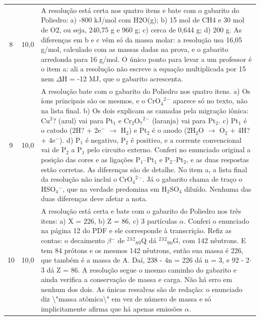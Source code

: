\documentclass{article}%
\begin{document}
\begin{longtable}{@{}c c p{}@{}}
8 & 10,0 & A resolução está certa nos quatro itens e bate com o gabarito do Poliedro: a) -800 kJ/mol com H2O(g); b) 15 mol de CH4 e 30 mol de O2, ou seja, 240,75 g e 960 g; c) cerca de 0,644 g; d) 200 g. As diferenças em b e c vêm só da massa molar: a resolução usa 16,05 g/mol, calculado com as massas dadas na prova, e o gabarito arredonda para 16 g/mol. O único ponto para levar a um professor é o item a: ali a resolução não escreve a equação multiplicada por 15 nem $\Delta$H = -12 MJ, que o gabarito acrescenta. \\
9 & 10,0 & A resolução bate com o gabarito do Poliedro nos quatro itens. a) Os íons principais são os mesmos, e o CrO$_{4}$$^2$$^{-}$ aparece só no texto, não na lista final. b) Os dois explicam as camadas pela migração iônica: Cu$^2$? (azul) vai para Pt$_{1}$ e Cr$_{2}$O$_{7}$$^2$$^{-}$ (laranja) vai para Pt$_{2}$. c) Pt$_{1}$ é o catodo (2H? + 2e$^{-}$ $\to$ H$_{2}$) e Pt$_{2}$ é o anodo (2H$_{2}$O $\to$ O$_{2}$ + 4H? + 4e$^{-}$). d) P$_{1}$ é negativo, P$_{2}$ é positivo, e a corrente convencional vai de P$_{2}$ a P$_{1}$ pelo circuito externo. Conferi no enunciado original a posição das cores e as ligações P$_{1}$--Pt$_{1}$ e P$_{2}$--Pt$_{2}$, e as duas respostas estão corretas. As diferenças são de detalhe. No item a, a lista final da resolução não inclui o CrO$_{4}$$^2$$^{-}$. Já o gabarito chama de traço o HSO$_{4}$$^{-}$, que na verdade predomina em H$_{2}$SO$_{4}$ diluído. Nenhuma das duas diferenças deve afetar a nota. \\
10 & 10,0 & A resolução está certa e bate com o gabarito do Poliedro nos três itens: a) X = 226, b) Z = 86, c) 3 partículas $\alpha$. Conferi o enunciado na página 12 do PDF e ele corresponde à transcrição. Refiz as contas: o decaimento $\beta$$^{-}$ de $^2$$^3$$^2$$_{8}$$_{9}$Q dá $^2$$^3$$^2$$_{9}$$_{0}$G, com 142 nêutrons. E tem 84 prótons e os mesmos 142 nêutrons, então sua massa é 226, que também é a massa de A. Daí, 238 - 4n = 226 dá n = 3, e 92 - 2$\cdot$3 dá Z = 86. A resolução segue o mesmo caminho do gabarito e ainda verifica a conservação de massa e carga. Não há erro em nenhum dos dois. As únicas ressalvas são de redação: o enunciado diz \textbackslash{}"massa atômica\textbackslash{}" em vez de número de massa e só implicitamente afirma que há apenas emissões $\alpha$. \\
\bottomrule\end{longtable}%
\end{document}
